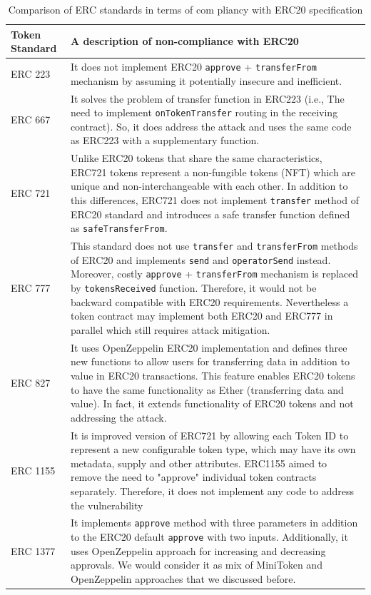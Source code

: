 \begin{table}
\centering
\begin{tabular}{|m{1.3cm}|m{6cm}|}
	\hline\centering
	Token Standard & A description of non-compliance with ERC20\\
	\hline\hline\centering
	ERC 223 \cite{Ref20} & It does not implement ERC20 \texttt{approve} + \texttt{transferFrom} mechanism by assuming it potentially insecure and inefficient.\\ 
	\hline\centering 
	ERC 667 \cite{Ref21} & It solves the problem of transfer function in ERC223 (i.e., The need to implement \texttt{onTokenTransfer} routing in the receiving contract). So, it does address the attack and uses the same code as ERC223 with a supplementary function.\\ 
	\hline\centering 
	ERC 721 \cite{Ref22} & Unlike ERC20 tokens that share the same characteristics, ERC721 tokens represent a non-fungible tokens (NFT) which are unique and non-interchangeable with each other. In addition to this differences, ERC721 does not implement \texttt{transfer} method of ERC20 standard and introduces a safe transfer function defined as \texttt{safeTransferFrom}.\\ 
	\hline\centering
	ERC 777 \cite{Ref23} & This standard does not use \texttt{transfer} and \texttt{transferFrom} methods of ERC20 and implements \texttt{send} and \texttt{operatorSend} instead. Moreover, costly \texttt{approve} + \texttt{transferFrom} mechanism is replaced by \texttt{tokensReceived} function. Therefore, it would not be backward compatible with ERC20 requirements. Nevertheless a token contract may implement both ERC20 and ERC777 in parallel which still requires attack mitigation.\\ 
	\hline\centering 
	ERC 827 \cite{Ref24} & It uses OpenZeppelin\cite{Ref10} ERC20 implementation and defines three new functions to allow users for transferring data in addition to value in ERC20 transactions. This feature enables ERC20 tokens to have the same functionality as Ether (transferring data and value). In fact, it extends functionality of ERC20 tokens and not addressing the attack. \\ 
	\hline\centering 
	ERC 1155 \cite{Ref25} & It is improved version of ERC721 by allowing each Token ID to represent a new configurable token type, which may have its own metadata, supply and other attributes. ERC1155 aimed to remove the need to "approve" individual token contracts separately. Therefore, it does not implement any code to address the vulnerability\\ 
	\hline\centering 
	ERC 1377 \cite{Ref26} & It implements \texttt{approve} method with three parameters in addition to the ERC20 default \texttt{approve} with two inputs. Additionally, it uses OpenZeppelin\cite{Ref10} approach for increasing and decreasing approvals. We would consider it as mix of MiniToken and OpenZeppelin approaches that we discussed before.\\
	\hline
\end{tabular}
\newline
\caption{Comparison of ERC standards in terms of com pliancy with ERC20 specification \label{tab:erc}}
\end{table}
